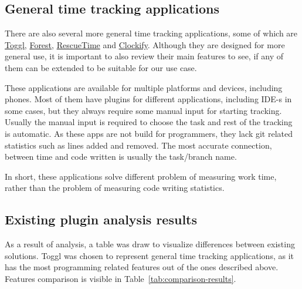 \subsection{General time tracking applications}\label{subsec:general-time-tracking-alternatives}
There are also several more general time tracking applications, some of which are
\href{https://toggl.com/}{Toggl}, \href{https://www.forestapp.cc/}{Forest}, \href{https://www.rescuetime.com/}{RescueTime} and
\href{https://clockify.me/}{Clockify}.
Although they are designed for more general use, it is important to also review their main features to see,
if any of them can be extended to be suitable for our use case.
\cite{general-time-tracking-alternatives}

These applications are available for multiple platforms and devices, including phones.
Most of them have plugins for different applications, including IDE-s in some cases, but they always require some manual
input for starting tracking.
Usually the manual input is required to choose the task and rest of the tracking is automatic.
As these apps are not build for programmers, they lack git related statistics such as lines added and removed.
The most accurate connection, between time and code written is usually the task/branch name.

In short, these applications solve different problem of measuring work time, rather than the problem of measuring
code writing statistics.

\subsection{Existing plugin analysis results}\label{subsec:existing-plugin-analysis-results}
As a result of analysis, a table was draw to visualize differences between existing solutions.
Toggl was chosen to represent general time tracking applications, as it has the most programming related features
out of the ones described above.
Features comparison is visible in Table~\ref{tab:comparison-results}.

